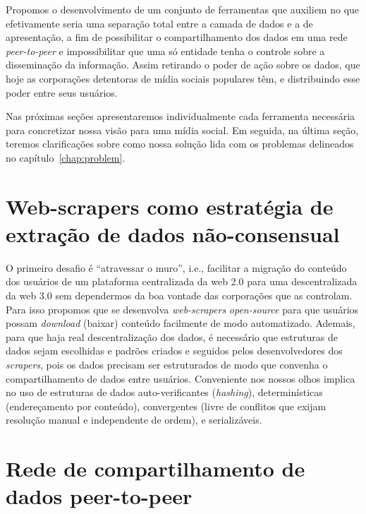 Propomos o desenvolvimento de um conjunto de ferramentas que auxiliem no que efetivamente seria uma separação total entre a camada de dados e a de apresentação, a fim de possibilitar o compartilhamento dos dados em uma rede \textit{peer-to-peer} e impossibilitar que uma só entidade tenha o controle sobre a disseminação da informação.
Assim retirando o poder de ação sobre os dados, que hoje as corporações detentoras de mídia sociais populares têm, e distribuindo esse poder entre seus usuários.

Nas próximas seções apresentaremos individualmente cada ferramenta necessária para concretizar nossa visão para uma mídia social.
Em seguida, na última seção, teremos clarificações sobre como nossa solução lida com os problemas delineados no capítulo~\ref{chap:problem}.

\section{Web-scrapers como estratégia de extração de dados não-consensual}

O primeiro desafio é ``atravessar o muro'', i.e., facilitar a migração do conteúdo dos usuários de um plataforma centralizada da web 2.0 para uma descentralizada da web 3.0 sem dependermos da boa vontade das corporações que as controlam.
Para isso propomos que se desenvolva \textit{web-scrapers} \textit{open-source} para que usuários possam \textit{download} (baixar) conteúdo facilmente de modo automatizado.
Ademais, para que haja real descentralização dos dados, é necessário que estruturas de dados sejam escolhidas e padrões criados e seguidos pelos desenvolvedores dos \textit{scrapers}, pois os dados precisam ser estruturados de modo que convenha o compartilhamento de dados entre usuários.
Conveniente nos nossos olhos implica no uso de estruturas de dados auto-verificantes (\textit{hashing}), determinísticas (endereçamento por conteúdo), convergentes (livre de conflitos que exijam resolução manual e independente de ordem), e serializáveis.

\section{Rede de compartilhamento de dados peer-to-peer}

